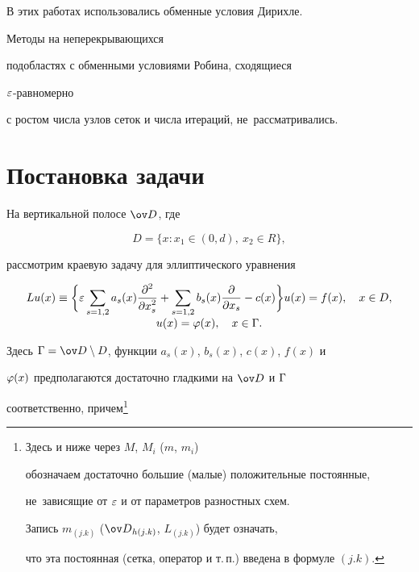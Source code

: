 В этих работах использовались обменные условия Дирихле.


Методы на неперекрывающихся


подобластях с обменными условиями Робина, сходящиеся \linebreak


$\varepsilon$-равномерно


с ростом числа узлов сеток и числа итераций, не~рассматривались.








\section{Постановка задачи}\label{section.2}








На вертикальной полосе $\od$, где


\begin{equation}\label{eq.2.1}


D=\{x: x_1 \in (0, d), \ x_2 \in R \},


\end{equation}


рассмотрим краевую задачу для эллиптического уравнения


\begin{equation} \label{eq.2.2}


\begin{array}{c}


L u(x) \eq \displaystyle\bigg\{ \eps \sum_{s=1,2} a_{s}(x)


\displaystyle\frac{\pad^2}{\pad x_s^2}+ \sum_{s=1,2} b_{s}(x)


\dfrac{\pad}{\pad x_s}-c(x) \bigg\} u(x)


= f(x), \quad x\in D,\\[3mm]


u(x) = \vp(x), \quad x\in \G.


\end{array}


\end{equation}


Здесь $\G=\od\setminus D$, функции $a_s(x)$, $b_s(x)$, $c(x)$, $f(x)$ и


$\varphi(x)$ предполагаются достаточно гладкими на $\od$ и $\Gamma$


соответственно, причем\footnote{Здесь и ниже через $M$, $M_i$ ($m$, $m_i$)


обозначаем достаточно большие (малые) положительные постоянные,


не~зависящие от $\varepsilon$ и от параметров разностных схем.


Запись $m_{(j.k)}$ ($\od_{h(j.k)}$, $L_{(j.k)}$) будет означать,


что эта постоянная (сетка, оператор и т.\,п.) введена в формуле $(j.k)$.}


